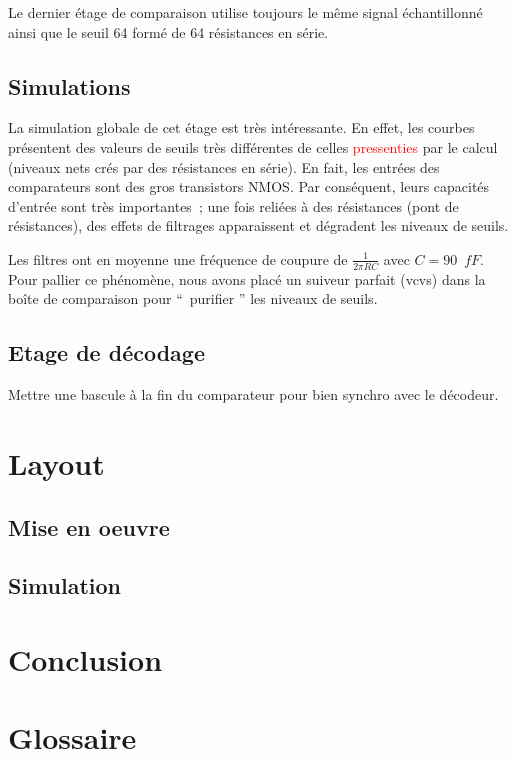 \documentclass[11pt]{article}
\begin{document}
Le dernier \'etage de comparaison utilise toujours le m\^eme signal \'echantillonn\'e ainsi que le seuil 64 form\'e
de 64 r\'esistances en s\'erie.

\subsection{Simulations}

La simulation globale de cet \'etage est tr\`es int\'eressante. En effet, les courbes pr\'esentent des valeurs de
seuils tr\`es diff\'erentes de celles \textcolor{red}{pressenties} par le calcul (niveaux nets cr\'es par des r\'esistances en s\'erie).
En fait, les entr\'ees des comparateurs sont des gros transistors NMOS. Par cons\'equent, leurs capacit\'es d’entr\'ee
sont tr\`es importantes ; une fois reli\'ees \`a des r\'esistances (pont de r\'esistances), des effets de filtrages
apparaissent et d\'egradent les niveaux de seuils.

Les filtres ont en moyenne une fr\'equence de coupure de $\frac{1}{2 \pi R C}$ avec $C  = 90 \phantom{2} fF.$
Pour pallier ce ph\'enom\`ene, nous avons plac\'e un suiveur parfait (vcvs) dans la bo\^ite de comparaison pour
`` purifier '' les niveaux de seuils.

\subsection{Etage de d\'ecodage}

Mettre une bascule \`a la fin du comparateur pour bien synchro avec le d\'ecodeur.

\section{Layout}
\subsection{Mise en oeuvre}
\subsection{Simulation}

\clearpage

\section{Conclusion}

\section{Glossaire}
\end{document}
